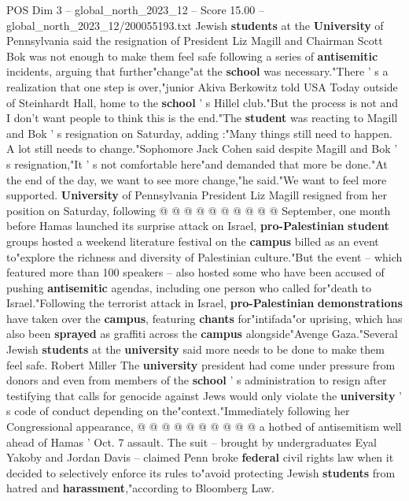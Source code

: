 \begin{textsample}{POS Dim 3 – global\_north\_2023\_12 – Score 15.00 – global\_north\_2023\_12/200055193.txt}  \label{ex:f3_pos_222}
Jewish \textbf{students} at the \textbf{University} of Pennsylvania said the resignation of President Liz Magill and Chairman Scott Bok was not enough to make them feel safe following a series of \textbf{antisemitic} incidents, arguing that further"change"at the \textbf{school} was necessary."There ' s a realization that one step is over,"junior Akiva Berkowitz told USA Today outside of Steinhardt Hall, home to the \textbf{school} ' s Hillel club."But the process is not and I don't want people to think this is the end."The \textbf{student} was reacting to Magill and Bok ' s resignation on Saturday, adding :"Many things still need to happen.
A lot still needs to change."Sophomore Jack Cohen said despite Magill and Bok ' s resignation,"It ' s not comfortable here"and demanded that more be done."At the end of the day, we want to see more change,"he said."We want to feel more supported. \textbf{University} of Pennsylvania President Liz Magill resigned from her position on Saturday, following @ @ @ @ @ @ @ @ @ @ September, one month before Hamas launched its surprise attack on Israel, \textbf{pro-Palestinian} \textbf{student} groups hosted a weekend literature festival on the \textbf{campus} billed as an event to"explore the richness and diversity of Palestinian culture."But the event -- which featured more than 100 speakers -- also hosted some who have been accused of pushing \textbf{antisemitic} agendas, including one person who called for"death to Israel."Following the terrorist attack in Israel, \textbf{pro-Palestinian} \textbf{demonstrations} have taken over the \textbf{campus}, featuring \textbf{chants} for"intifada"or uprising, which has also been \textbf{sprayed} as graffiti across the \textbf{campus} alongside"Avenge Gaza."Several Jewish \textbf{students} at the \textbf{university} said more needs to be done to make them feel safe.
Robert Miller The \textbf{university} president had come under pressure from donors and even from members of the \textbf{school} ' s administration to resign after testifying that calls for genocide against Jews would only violate the \textbf{university} ' s code of conduct depending on the"context."Immediately following her Congressional appearance, @ @ @ @ @ @ @ @ @ @ a hotbed of antisemitism well ahead of Hamas ' Oct. 7 assault.
The suit -- brought by undergraduates Eyal Yakoby and Jordan Davis -- claimed Penn broke \textbf{federal} civil rights law when it decided to selectively enforce its rules to"avoid protecting Jewish \textbf{students} from hatred and \textbf{harassment},"according to Bloomberg Law.

\end{textsample}
